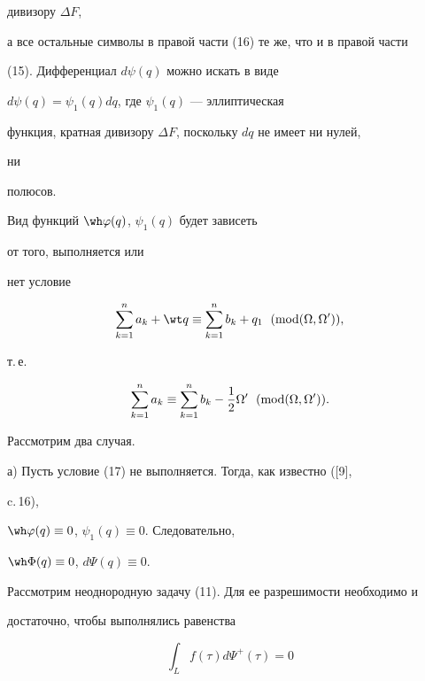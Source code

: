 дивизору $\Delta F$, 


а все остальные символы в правой части (16) те же, что и в правой части 


(15). Дифференциал $d\psi(q)$ можно искать в виде 


$d\psi(q)=\psi_1(q)dq$, где $\psi_1(q)$ --- эллиптическая 


функция, кратная дивизору $\Delta F$, поскольку $dq$ не имеет ни нулей, 


ни 


полюсов. 


 


Вид функций $\wh\varphi(q)$, $\psi_1(q)$ будет зависеть


от того, выполняется или 


нет условие 


$$ 


\sum^n_{k=1}a_k+\wt q\equiv\sum^n_{k=1}b_k+q_1 


\ \;(\Mod(\Omega,\Omega')), 


$$ 


т.\,е. 


\begin{equation} 


\sum^n_{k=1}a_k\equiv\sum^n_{k=1}b_k-\frac{1}{2}\Omega' 


\ \;(\Mod(\Omega,\Omega')). 


\end{equation} 


Рассмотрим два случая. 


 


а) Пусть условие (17) не выполняется. Тогда, как известно ([9], 


c.\,16), 


$\wh\varphi(q)\equiv0$, $\psi_1(q)\equiv0$. Следовательно, 


$\wh\Phi(q)\equiv0$, $d\Psi(q)\equiv0$. 


 


Рассмотрим неоднородную задачу (11). Для ее разрешимости необходимо и 


достаточно, чтобы выполнялись равенства 


\begin{equation} 


\int_L f(\tau)d\Psi^+(\tau)=0 


\end{equation} 


